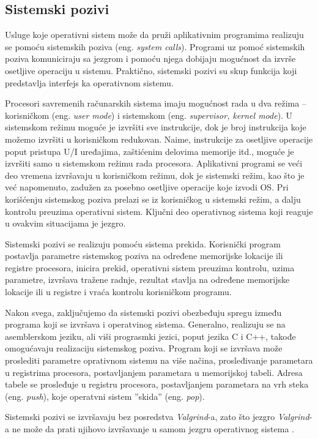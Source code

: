 \documentclass[12pt,oneside]{memoir}
\theoremstyle{plain}
\theoremstyle{definition}
\begin{document}
\subsection*{Sistemski pozivi}
Usluge koje operativni sistem može da pruži aplikativnim programima realizuju se pomoću sistemskih poziva (eng. \textit{system calls}). Programi uz pomoć sistemskih poziva komuniciraju sa jezgrom i pomoću njega dobijaju mogućnost da izvrše osetljive operaciju u sistemu. Praktično, sistemski pozivi su skup funkcija koji predstavlja interfejs ka operativnom sistemu. 

Procesori savremenih računarskih sistema imaju mogućnost rada u dva režima – korisničkom (eng. \textit{user mode}) i sistemskom (eng. \textit{supervisor, kernel mode}). U sistemskom režimu moguće je izvršiti sve instrukcije, dok je broj instrukcija koje možemo izvršiti u korisničkom redukovan. Naime, instrukcije za osetljive operacije poput pristupa U/I uređajima, zaštićenim delovima memorije itd., moguće je izvršiti samo u sistemskom režimu rada procesora. Aplikativni programi se veći deo vremena izvršavaju u korisničkom režimu, dok je sistemski režim, kao što je već napomenuto, zadužen za posebno osetljive operacije koje izvodi OS. Pri korišćenju sistemskog poziva prelazi se iz korisničkog u sistemski režim, a dalju kontrolu preuzima operativni sistem. Ključni deo operativnog sistema koji reaguje u ovakvim situacijama je jezgro.

Sistemski pozivi se realizuju pomoću sistema prekida.  Korisnički program postavlja parametre sistemskog poziva na određene memorijske lokacije ili registre procesora, inicira prekid, operativni sistem preuzima kontrolu, uzima parametre, izvršava tražene radnje, rezultat stavlja na određene memorijske lokacije ili u registre i vraća kontrolu korisničkom programu.

Nakon svega, zaključujemo da sistemski pozivi obezbeđuju spregu između programa koji se izvršava i operatvinog sistema. Generalno, realizuju se na asemblerskom jeziku, ali viši prograsmki jezici, poput jezika C i C++, takođe omogućavaju realizaciju sistemskog poziva. Program koji se izvršava može proslediti parametre oprativnom sistemu na više načina, prosleđivanje parametara u registrima procesora, postavljanjem parametara u memorijskoj tabeli. Adresa tabele se prosleđuje u registru procesora, postavljanjem parametara na vrh steka (eng. \textit{push}), koje operatvni sistem ''skida'' (eng. \textit{pop}).

Sistemski pozivi se izvršavaju bez posredstva \textit{Valgrind}-a, zato što jezgro \textit{Valgrind}-a ne može da prati njihovo izvršavanje u samom jezgru operativnog sistema \cite{os}. 
\end{document}
